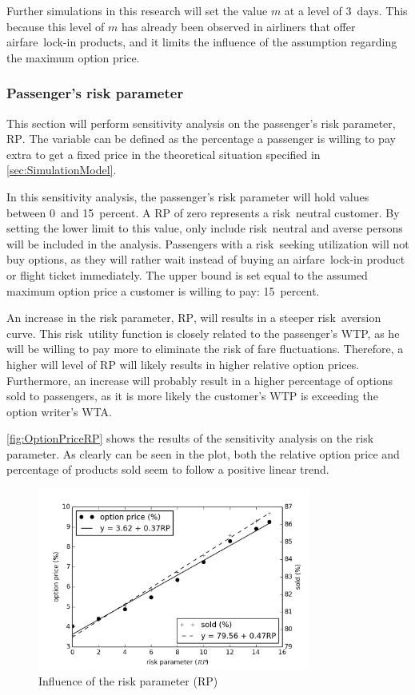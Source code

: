 Further simulations in this research will set the value $m$ at a level of 3~days. This because this level of $m$ has already been observed in airliners that offer airfare~lock-in products, and it limits the influence of the assumption regarding the maximum option price.


\subsubsection{Passenger's risk parameter}
This section will perform sensitivity analysis on the passenger's risk parameter, $\mbox{RP}$. The variable can be defined as the percentage a passenger is willing to pay extra to get a fixed price in the theoretical situation specified in \autoref{sec:SimulationModel}.

In this sensitivity analysis, the passenger's risk parameter will hold values between 0~and 15~percent. A $\mbox{RP}$ of zero represents a risk~neutral customer. By setting the lower limit to this value, only include risk~neutral and averse persons will be included in the analysis. Passengers with a risk~seeking utilization will not buy options, as they will rather wait instead of buying an airfare~lock-in product or flight ticket immediately. The upper bound is set equal to the assumed maximum option price a customer is willing to pay: 15~percent.

An increase in the risk parameter, $\mbox{RP}$, will results in a steeper risk~aversion curve. This risk~utility function is closely related to the passenger's WTP, as he will be willing to pay more to eliminate the risk of fare fluctuations. Therefore, a higher will level of $\mbox{RP}$ will likely results in higher relative option prices. Furthermore, an increase will probably result in a higher percentage of options sold to passengers, as it is more likely the customer's WTP is exceeding the option writer's WTA.

\autoref{fig:OptionPriceRP} shows the results of the sensitivity analysis on the risk parameter. As clearly can be seen in the plot, both the relative option price and percentage of products sold seem to follow a positive linear trend.

\begin{figure}
    \centering
    \includegraphics[width=0.8\textwidth]{figures/OptionPrice_RP.png}
    \caption{Influence of the risk parameter ($\mbox{RP}$)}
    \label{fig:OptionPriceRP}
\end{figure}

